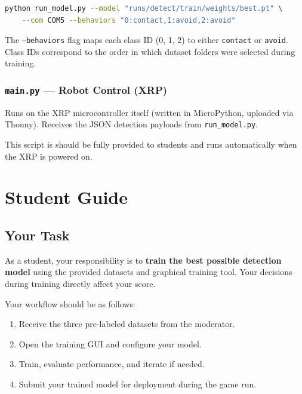 \documentclass[11pt,a4paper]{article}
\begin{document}
\begin{lstlisting}[language=bash, caption={Running the detection script}]
python run_model.py --model "runs/detect/train/weights/best.pt" \
    --com COM5 --behaviors "0:contact,1:avoid,2:avoid"
\end{lstlisting}

The \texttt{--behaviors} flag maps each class ID (0, 1, 2) to either \texttt{contact} or \texttt{avoid}. Class IDs correspond to the order in which dataset folders were selected during training.

\subsubsection*{\texttt{main.py} — Robot Control (XRP)}

Runs on the XRP microcontroller itself (written in MicroPython, uploaded via Thonny). Receives the JSON detection payloads from \texttt{run\_model.py}.

This script is should be fully provided to students and runs automatically when the XRP is powered on.

\section{Student Guide}

\subsection{Your Task}

As a student, your responsibility is to \textbf{train the best possible detection model} using the provided datasets and graphical training tool. Your decisions during training directly affect your score.

\pagebreak

Your workflow should be as follows:
\begin{enumerate}
    \item Receive the three pre-labeled datasets from the moderator.
    \item Open the training GUI and configure your model.
    \item Train, evaluate performance, and iterate if needed.
    \item Submit your trained model for deployment during the game run.
\end{enumerate}
\end{document}
